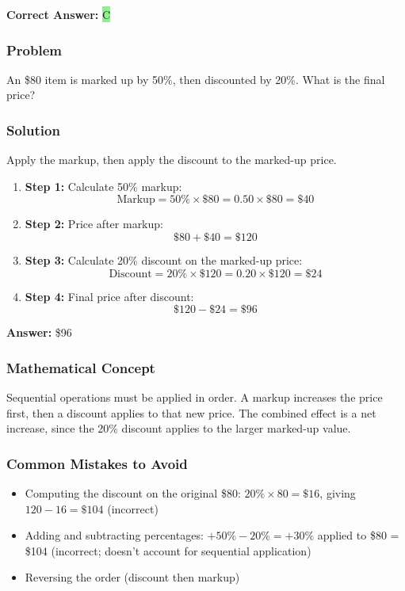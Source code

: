 \documentclass[12pt]{article}
\begin{document}
\textbf{Correct Answer: } \colorbox{lightgreen}{C}

\subsubsection*{Problem}
An \$80 item is marked up by 50\%, then discounted by 20\%. What is the final price?

\subsubsection*{Solution}

Apply the markup, then apply the discount to the marked-up price.

\begin{enumerate}
\item \textbf{Step 1:} Calculate 50\% markup:
  \[
  \text{Markup} = 50\% \times \$80 = 0.50 \times \$80 = \$40
  \]
\item \textbf{Step 2:} Price after markup:
  \[
  \$80 + \$40 = \$120
  \]
\item \textbf{Step 3:} Calculate 20\% discount on the marked-up price:
  \[
  \text{Discount} = 20\% \times \$120 = 0.20 \times \$120 = \$24
  \]
\item \textbf{Step 4:} Final price after discount:
  \[
  \$120 - \$24 = \$96
  \]
\end{enumerate}

\textbf{Answer: } \$96

\subsubsection*{Mathematical Concept}
Sequential operations must be applied in order. A markup increases the price first, then a discount applies to that new price. The combined effect is a net increase, since the 20\% discount applies to the larger marked-up value.

\subsubsection*{Common Mistakes to Avoid}
\begin{itemize}
\item Computing the discount on the original \$80: $20\% \times 80 = \$16$, giving $120 - 16 = \$104$ (incorrect)
\item Adding and subtracting percentages: $+50\% - 20\% = +30\%$ applied to \$80 = \$104 (incorrect; doesn't account for sequential application)
\item Reversing the order (discount then markup)
\end{itemize}
\end{document}
